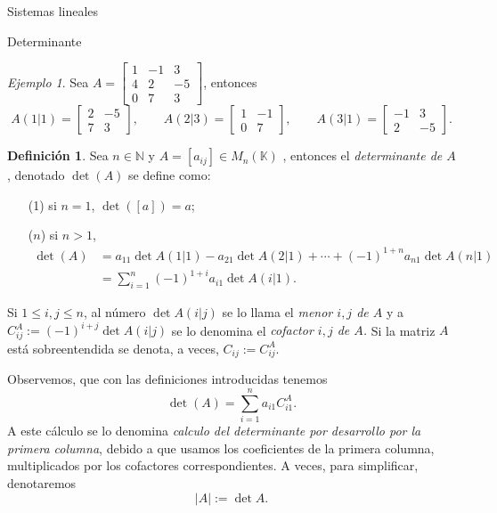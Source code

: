 \documentclass[a4paper,12pt,twoside,spanish,reqno]{amsbook}
\numberwithin{equation}{section}
\theoremstyle{definition}
\newtheorem{definicion}[teorema]{Definici\'on}
\theoremstyle{remark}
\newtheorem*{ejemplo*}{Ejemplo}
\newcommand{\K}{\mathbb K}
\begin{document}
\begin{chapter}{Sistemas lineales}
\begin{section}{Determinante}
    \begin{ejemplo*}
        Sea $A= \begin{bmatrix}1&-1&3\\4&2&-5 \\ 0&7&3\end{bmatrix}$,  entonces
        \begin{equation*}
        A(1|1)= \begin{bmatrix} 2&-5 \\ 7&3\end{bmatrix}, \qquad
        A(2|3)= \begin{bmatrix} 1&-1\\0&7\end{bmatrix}, \qquad
        A(3|1)= \begin{bmatrix} -1&3\\2&-5 \end{bmatrix}.
        \end{equation*}
    \end{ejemplo*}		
    
    \begin{definicion}
        Sea $n \in \mathbb N$ y $A =[a_{ij}] \in M_n(\K)$ , entonces el \textit{determinante de $A$}, denotado $\det(A)$ se define como:
        \begin{enumerate}
            \item[(1)] si $n=1$,  $\det([a]) =a$;
            \item[($n$)] si $n >1$, 
            \begin{align*}
            \det(A) &=  a_{11}\det A(1|1) - a_{21}\det A(2|1) + \cdots + (-1)^{1+n}  a_{n1}\det A(n|1) \\
            &= \sum_{i=1}^{n} (-1)^{1+i}  a_{i1}\det A(i|1).
            \end{align*}
        \end{enumerate}
        Si  $1 \le i,j \le n$, al número $\det A(i|j)$ se lo llama el \textit{menor $i,j$ de $A$} y a $C^A_{ij}:= (-1)^{i+j} \det A(i|j)$ se lo denomina  el \textit{cofactor $i,j$ de $A$.} Si la matriz $A$ está sobreentendida se denota, a veces, $C_{ij} := C^A_{ij}$.
    \end{definicion}
    
    Observemos, que con las definiciones introducidas  tenemos
    \begin{equation}\label{def-determinante}
    \det(A) = \sum_{i=1}^{n}  a_{i1}C^A_{i1}.
    \end{equation}
    A este cálculo  se lo denomina \textit{calculo del determinante por desarrollo por la primera columna}, debido  a que usamos los coeficientes de la primera columna,  multiplicados por los cofactores correspondientes. A veces, para simplificar,  denotaremos
    $$
    |A| := \det A.
    $$
    

\end{section}
\end{chapter}
\end{document}
